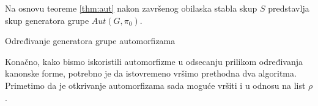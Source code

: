 \documentclass[12pt,oneside]{memoir}
\theoremstyle{definition}
\begin{document}
  Na osnovu teoreme \ref{thm:aut} nakon završenog obilaska stabla skup $S$
  predstavlja skup generatora grupe $Aut(G, \pi_0)$.

  \begin{algorithm}[H]
	  \caption{Određivanje generatora grupe automorfizama}
	  \begin{algorithmic}[1]
			\State \Return {$|\nu|$}
		  \EndIf
					\State {}
				\EndIf
			\EndIf
		  \EndFor
			\If {$\zeta = ()$}
				\State {$\zeta \gets \nu$}
			\EndIf

				\State {}
			\EndIf
		  \EndIf
		  \State \Return{$|\nu|$}
		  \EndProcedure
	  \end{algorithmic}
  \end{algorithm}

  Konačno, kako bismo iskoristili automorfizme u odsecanju prilikom određivanja
  kanonske forme, potrebno je da istovremeno vršimo prethodna dva algoritma.
  Primetimo da je otkrivanje automorfizama sada moguće vršiti i u odnosu na
  list $\rho$.
\end{document}
